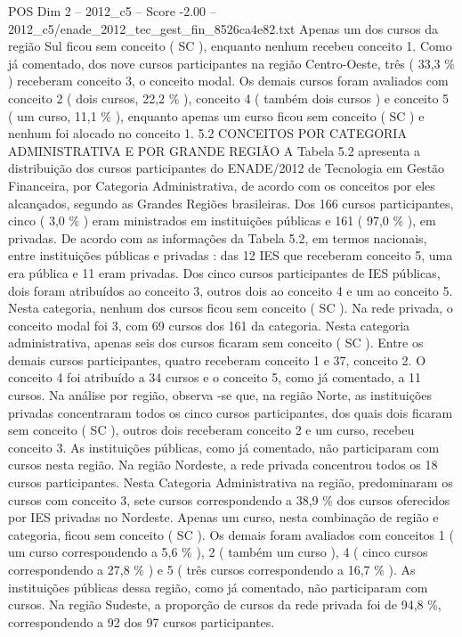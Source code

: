 \begin{textsample}{POS Dim 2 – 2012\_c5 – Score -2.00 – 2012\_c5/enade\_2012\_tec\_gest\_fin\_8526ca4e82.txt}
Apenas um dos cursos da região Sul ficou sem conceito ( SC ), enquanto nenhum recebeu conceito 1.
Como já comentado, dos nove cursos participantes na região Centro-Oeste, três ( 33,3 \% ) receberam conceito 3, o conceito modal.
Os demais cursos foram avaliados com conceito 2 ( dois cursos, 22,2 \% ), conceito 4 ( também dois cursos ) e conceito 5 ( um curso, 11,1 \% ), enquanto apenas um curso ficou sem conceito ( SC ) e nenhum foi alocado no conceito 1. 5.2 CONCEITOS POR CATEGORIA ADMINISTRATIVA E POR GRANDE REGIÃO A Tabela 5.2 apresenta a distribuição dos cursos participantes do ENADE/2012 de Tecnologia em Gestão Financeira, por Categoria Administrativa, de acordo com os conceitos por eles alcançados, segundo as Grandes Regiões brasileiras.
Dos 166 cursos participantes, cinco ( 3,0 \% ) eram ministrados em instituições públicas e 161 ( 97,0 \% ), em privadas.
De acordo com as informações da Tabela 5.2, em termos nacionais, entre instituições públicas e privadas : das 12 IES que receberam conceito 5, uma era pública e 11 eram privadas.
Dos cinco cursos participantes de IES públicas, dois foram atribuídos ao conceito 3, outros dois ao conceito 4 e um ao conceito 5.
Nesta categoria, nenhum dos cursos ficou sem conceito ( SC ).
Na rede privada, o conceito modal foi 3, com 69 cursos dos 161 da categoria.
Nesta categoria administrativa, apenas seis dos cursos ficaram sem conceito ( SC ).
Entre os demais cursos participantes, quatro receberam conceito 1 e 37, conceito 2.
O conceito 4 foi atribuído a 34 cursos e o conceito 5, como já comentado, a 11 cursos.
Na análise por região, observa -se que, na região Norte, as instituições privadas concentraram todos os cinco cursos participantes, dos quais dois ficaram sem conceito ( SC ), outros dois receberam conceito 2 e um curso, recebeu conceito 3.
As instituições públicas, como já comentado, não participaram com cursos nesta região.
Na região Nordeste, a rede privada concentrou todos os 18 cursos participantes.
Nesta Categoria Administrativa na região, predominaram os cursos com conceito 3, sete cursos correspondendo a 38,9 \% dos cursos oferecidos por IES privadas no Nordeste.
Apenas um curso, nesta combinação de região e categoria, ficou sem conceito ( SC ).
Os demais foram avaliados com conceitos 1 ( um curso correspondendo a 5,6 \% ), 2 ( também um curso ), 4 ( cinco cursos correspondendo a 27,8 \% ) e 5 ( três cursos correspondendo a 16,7 \% ).
As instituições públicas dessa região, como já comentado, não participaram com cursos.
Na região Sudeste, a proporção de cursos da rede privada foi de 94,8 \%, correspondendo a 92 dos 97 cursos participantes.

\end{textsample}
